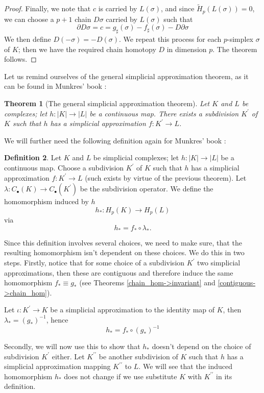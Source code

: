 \documentclass[draft,toc=bib]{scrartcl}
\theoremstyle{plain}
\newtheorem{theorem}{Theorem}[section]
\theoremstyle{definition}
\newtheorem	{definition}[theorem]{Definition}
\theoremstyle{remark}
\newcommand{\pprime}{{\prime\prime}}
\begin{document}
\begin{proof}
Finally, we note that $c$ is carried by $L(\sigma)$, and since $\tilde{H}_p(L(\sigma))=0$, we can choose a $p+1$ chain $D\sigma$ carried by $L(\sigma)$ such that 
\[
\partial D\sigma=c=g_\sharp(\sigma)-f_\sharp(\sigma)-D\partial\sigma
\]
We then define $D(-\sigma)=-D(\sigma)$. We repeat this process for each $p$-simplex $\sigma$ of $K$; then we have the required chain homotopy $D$ in dimension $p$. The theorem follows.
\end{proof}

Let us remind ourselves of the general simplicial approximation theorem, as it can be found in Munkres' book \cite[Thm. 16.5, p. 85]{mu}:

\begin{theorem}[The general simplicial approximation theorem]
	Let $K$ and $L$ be complexes; let $h: |K|\to |L|$ be a continuous map. There exists a subdivision $K^\prime$ of $K$ such that $h$ has a simplicial approximation $f:K^\prime \to L$.
\end{theorem}

We will further need the following definition again for Munkres' book \cite[p. 100]{mu}:
\begin{definition}
	Let $K$ and $L$ be simplicial complexes; let $h:|K|\to |L|$ be a continuous map. Choose a subdivision $K^\prime$ of $K$ such that $h$ has a simplicial approximation $f:K^\prime\to L$ (such exists by virtue of the previous theorem). Let $\lambda:C_\bullet(K)\to C_\bullet(K^\prime)$ be the subdivision operator. We define the homomorphism induced by $h$ 
	\[
	h_\ast: H_p(K)\to H_p(L)
	\]
	via
	\[
	h_\ast=f_\ast\circ \lambda_\ast.
	\]
\end{definition}


Since this definition involves several choices, we need to make sure, that the resulting homomorphism isn't dependent on these choices. We do this in two steps. Firstly, notice that for some choice of a subdivision $K^\prime$ two simplicial approximations, then these are contiguous and therefore induce the same homomorphism $f_\ast\equiv g_\ast$ (see Theorems \ref{chain_hom->invariant} and \ref{contiguous->chain_hom}).

Let $\iota: K^\prime\to K $ be a simplicial approximation to the identity map of $K$, then $\lambda_\ast=(g_\ast)^{-1}$, hence
\[
h_\ast=f_\ast\circ(g_\ast)^{-1}
\]

Secondly, we will now use this to show that $h_\ast$ doesn't depend on the choice of subdivision $K^\prime$ either. Let $K^\pprime$ be another subdivision of $K$ such that $h$ has a simplicial approximation mapping $K^\pprime$ to $L$. We will see that the induced homomorphism $h_\ast$ does not change if we use substitute $K$ with $K^\pprime$ in its definition.
\end{document}
